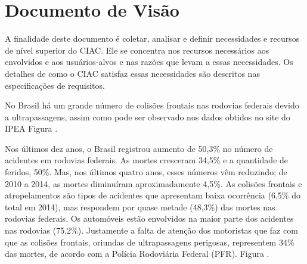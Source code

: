 \chapter[Documento de Visão]{Documento de Visão}
A finalidade deste documento é coletar, analisar e definir necessidades e
recursos de nível superior do CIAC. Ele se concentra nos recursos necessários
aos envolvidos e aos usuários-alvos e nas razões que levam a essas necessidades.
Os detalhes de como o CIAC satisfaz essas necessidades são descritos nas
especificações de requisitos.

No Brasil há um grande número de colisões frontais nas rodovias federais devido
a ultrapassagens, assim como pode ser observado nos dados obtidos no site do
IPEA Figura \cite{ipea}.

Nos últimos dez anos, o Brasil registrou aumento de 50,3\% no número de acidentes
em rodovias federais. As mortes cresceram 34,5\% e a quantidade de feridos, 50\%.
Mas, nos últimos quatro anos, esses números vêm reduzindo; de 2010 a 2014, as
mortes diminuíram aproximadamente 4,5\%. As colisões frontais e atropelamentos
são tipos de acidentes que apresentam baixa ocorrência (6,5\% do total em 2014),
mas respondem por quase metade (48,3\%) das mortes nas rodovias federais. Os
automóveis estão envolvidos na maior parte dos acidentes nas rodovias (75,2\%).
Justamente a falta de atenção dos motoristas que faz com que as colisões frontais,
oriundas de ultrapassagens perigosas, representem 34\% das mortes, de acordo
com a Polícia Rodoviária Federal (PFR). Figura \cite{ipea}.
